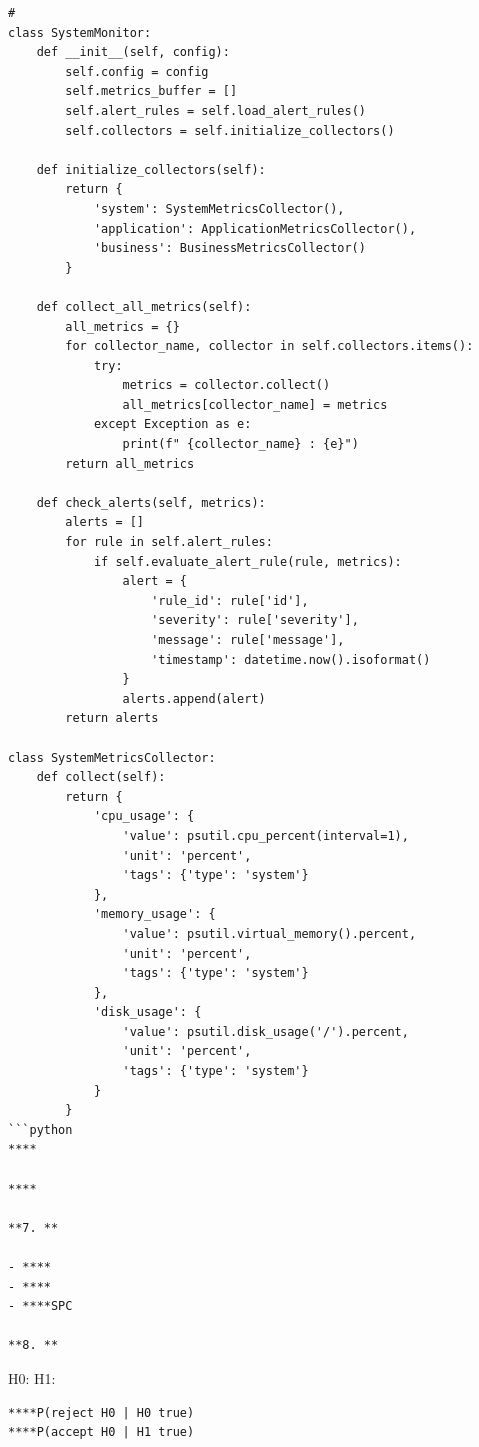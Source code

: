 \begin{verbatim}
# 
class SystemMonitor:
    def __init__(self, config):
        self.config = config
        self.metrics_buffer = []
        self.alert_rules = self.load_alert_rules()
        self.collectors = self.initialize_collectors()
        
    def initialize_collectors(self):
        return {
            'system': SystemMetricsCollector(),
            'application': ApplicationMetricsCollector(),
            'business': BusinessMetricsCollector()
        }
    
    def collect_all_metrics(self):
        all_metrics = {}
        for collector_name, collector in self.collectors.items():
            try:
                metrics = collector.collect()
                all_metrics[collector_name] = metrics
            except Exception as e:
                print(f" {collector_name} : {e}")
        return all_metrics
    
    def check_alerts(self, metrics):
        alerts = []
        for rule in self.alert_rules:
            if self.evaluate_alert_rule(rule, metrics):
                alert = {
                    'rule_id': rule['id'],
                    'severity': rule['severity'],
                    'message': rule['message'],
                    'timestamp': datetime.now().isoformat()
                }
                alerts.append(alert)
        return alerts

class SystemMetricsCollector:
    def collect(self):
        return {
            'cpu_usage': {
                'value': psutil.cpu_percent(interval=1),
                'unit': 'percent',
                'tags': {'type': 'system'}
            },
            'memory_usage': {
                'value': psutil.virtual_memory().percent,
                'unit': 'percent',
                'tags': {'type': 'system'}
            },
            'disk_usage': {
                'value': psutil.disk_usage('/').percent,
                'unit': 'percent',
                'tags': {'type': 'system'}
            }
        }
```python
****

****

**7. **

- ****
- ****
- ****SPC

**8. **
\end{verbatim}

H0: H1:

\begin{verbatim}
****P(reject H0 | H0 true)
****P(accept H0 | H1 true)
\end{verbatim}

